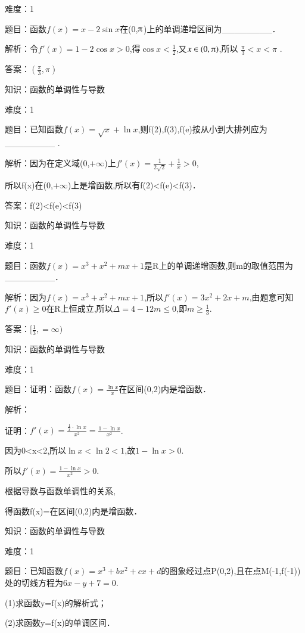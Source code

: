 \documentclass{article} %
\begin{document}
难度：1

题目：函数$f(x)=x-2\sin x$在(0,$\piup$)上的单调递增区间为\_\_\_\_\_\_\_\_．

解析：令$f'(x)=1-2\cos x>0$,得$\cos x<\frac{1}{2}$,又$x\in(0,\piup)$,所以 $\frac{\pi}{3}<x<\pi$
.

答案：$(\frac{\pi}{3},\pi)$

\noindent 

知识：函数的单调性与导数

难度：1

题目：已知函数$f(x)=\sqrt{x}+\ln x$,则f(2),f(3),f(e)按从小到大排列应为\_\_\_\_\_\_\_\_ .

解析：因为在定义域(0,$+\infty$)上$f'(x)=\frac{1}{2\sqrt{2}}+\frac{1}{x}>0$,

所以f(x)在(0,$+\infty$)上是增函数,所以有f(2)<f(e)<f(3)．

答案：f(2)<f(e)<f(3)



知识：函数的单调性与导数

难度：1

题目：函数$f(x)=x^{3}+x^{2}+mx+1$是R上的单调递增函数,则m的取值范围为\_\_\_\_\_\_\_\_．

解析：因为$f(x)=x^{3}+x^{2}+mx+1$,所以$f'(x)=3x^{2}+2x+m$,由题意可知$f'(x)\ge0$在R上恒成立,所以$\Delta=4-12m\le0$,即$m\ge\frac{1}{3}$.

答案：$[\frac{1}{3},=\infty)$



知识：函数的单调性与导数

难度：1

题目：证明：函数$f(x)=\frac{\ln x}{x}$在区间(0,2)内是增函数．

解析：

证明：$f'(x)=\frac{\frac{1}{x}\cdot \ln x}{x^2}=\frac{1-\ln x}{x^2}$.

因为0<x<2,所以$\ln x<\ln 2<1$,故$1-\ln x>0$.

所以$f'(x)=\frac{1-\ln x}{x^2}>0$.

根据导数与函数单调性的关系,

得函数f(x)=在区间(0,2)内是增函数．



知识：函数的单调性与导数

难度：1

题目：已知函数$f(x)=x^{3}+bx^{2}+cx+d$的图象经过点P(0,2),且在点M(-1,f(-1))处的切线方程为$6x-y+7=0$.

(1)求函数y=f(x)的解析式；

(2)求函数y=f(x)的单调区间．
\end{document}
